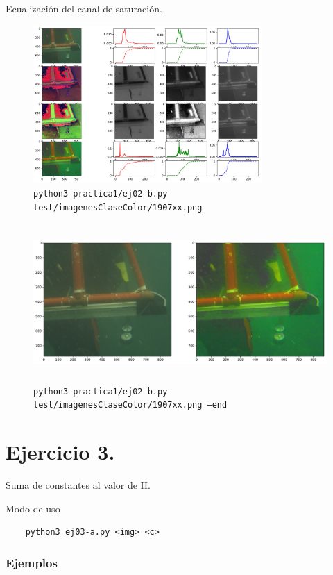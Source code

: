 \documentclass[11pt, spanish]{article}
\begin{document}
Ecualización del canal de saturación.
\begin{figure}[H]
\centering
  \includegraphics[height=6cm]{informe-imgs/ej02-b-2.pdf}
  \caption{\texttt{python3 practica1/ej02-b.py test/imagenesClaseColor/1907xx.png}}
\end{figure}
\begin{figure}[H]
\centering
  \includegraphics[height=6cm]{informe-imgs/ej02-b-3.pdf}
  \caption{\texttt{python3 practica1/ej02-b.py test/imagenesClaseColor/1907xx.png --end}}
\end{figure}

\newpage

\section{Ejercicio 3.}

Suma de constantes al valor de H.

Modo de uso
\begin{verbatim}
    python3 ej03-a.py <img> <c>
\end{verbatim}

\subsubsection*{Ejemplos}
\end{document}
